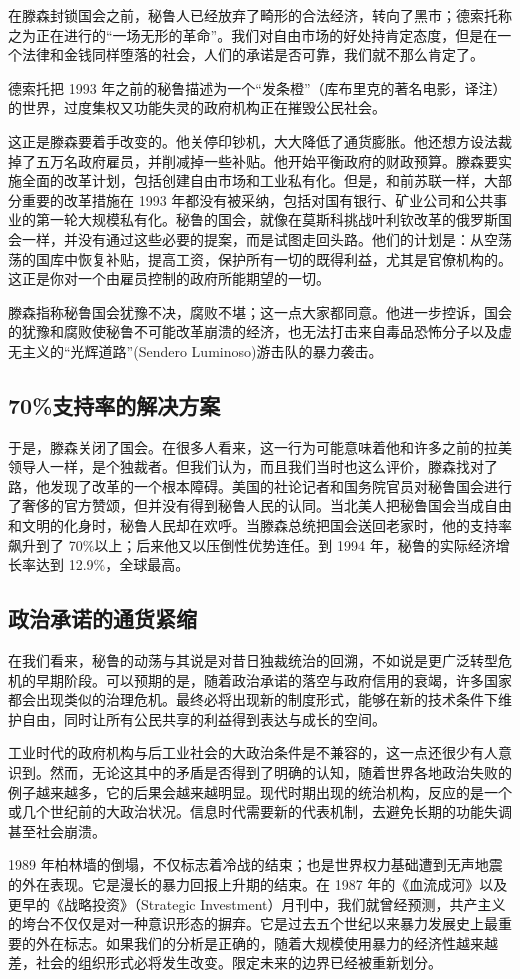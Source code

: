 在滕森封锁国会之前，秘鲁人已经放弃了畸形的合法经济，转向了黑市；德索托称之为正在进行的“一场无形的革命”。我们对自由市场的好处持肯定态度，但是在一个法律和金钱同样堕落的社会，人们的承诺是否可靠，我们就不那么肯定了。

德索托把 1993 年之前的秘鲁描述为一个“发条橙”（库布里克的著名电影，译注）的世界，过度集权又功能失灵的政府机构正在摧毁公民社会。

这正是滕森要着手改变的。他关停印钞机，大大降低了通货膨胀。他还想方设法裁掉了五万名政府雇员，并削减掉一些补贴。他开始平衡政府的财政预算。滕森要实施全面的改革计划，包括创建自由市场和工业私有化。但是，和前苏联一样，大部分重要的改革措施在 1993 年都没有被采纳，包括对国有银行、矿业公司和公共事业的第一轮大规模私有化。秘鲁的国会，就像在莫斯科挑战叶利钦改革的俄罗斯国会一样，并没有通过这些必要的提案，而是试图走回头路。他们的计划是：从空荡荡的国库中恢复补贴，提高工资，保护所有一切的既得利益，尤其是官僚机构的。这正是你对一个由雇员控制的政府所能期望的一切。

滕森指称秘鲁国会犹豫不决，腐败不堪；这一点大家都同意。他进一步控诉，国会的犹豫和腐败使秘鲁不可能改革崩溃的经济，也无法打击来自毒品恐怖分子以及虚无主义的“光辉道路”(Sendero Luminoso)游击队的暴力袭击。

\subsection{70\%支持率的解决方案}
于是，滕森关闭了国会。在很多人看来，这一行为可能意味着他和许多之前的拉美领导人一样，是个独裁者。但我们认为，而且我们当时也这么评价，滕森找对了路，他发现了改革的一个根本障碍。美国的社论记者和国务院官员对秘鲁国会进行了奢侈的官方赞颂，但并没有得到秘鲁人民的认同。当北美人把秘鲁国会当成自由和文明的化身时，秘鲁人民却在欢呼。当滕森总统把国会送回老家时，他的支持率飙升到了 70\%以上；后来他又以压倒性优势连任。到 1994 年，秘鲁的实际经济增长率达到 12.9\%，全球最高。

\subsection{政治承诺的通货紧缩}
在我们看来，秘鲁的动荡与其说是对昔日独裁统治的回溯，不如说是更广泛转型危机的早期阶段。可以预期的是，随着政治承诺的落空与政府信用的衰竭，许多国家都会出现类似的治理危机。最终必将出现新的制度形式，能够在新的技术条件下维护自由，同时让所有公民共享的利益得到表达与成长的空间。

工业时代的政府机构与后工业社会的大政治条件是不兼容的，这一点还很少有人意识到。然而，无论这其中的矛盾是否得到了明确的认知，随着世界各地政治失败的例子越来越多，它的后果会越来越明显。现代时期出现的统治机构，反应的是一个或几个世纪前的大政治状况。信息时代需要新的代表机制，去避免长期的功能失调甚至社会崩溃。

1989 年柏林墙的倒塌，不仅标志着冷战的结束；也是世界权力基础遭到无声地震的外在表现。它是漫长的暴力回报上升期的结束。在 1987 年的《血流成河》以及更早的《战略投资》（Strategic Investment）月刊中，我们就曾经预测，共产主义的垮台不仅仅是对一种意识形态的摒弃。它是过去五个世纪以来暴力发展史上最重要的外在标志。如果我们的分析是正确的，随着大规模使用暴力的经济性越来越差，社会的组织形式必将发生改变。限定未来的边界已经被重新划分。